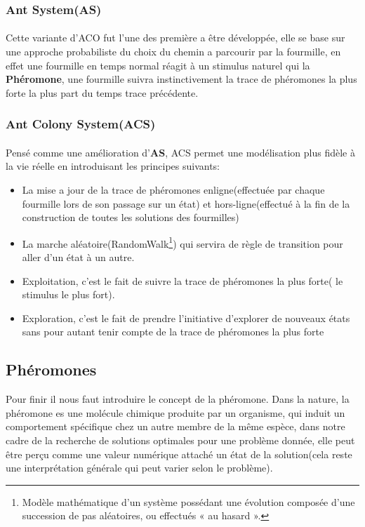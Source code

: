 \subsubsection{Ant System(AS)}
\paragraph{}\label{AS}
Cette variante d'ACO fut l'une des première a être développée, elle se base sur une approche probabiliste du choix du chemin a parcourir par la fourmille, en effet une fourmille en temps normal réagit à un stimulus naturel qui la \textbf{Phéromone}, une fourmille suivra instinctivement la trace de phéromones la plus forte la plus part du temps trace précédente.

\subsubsection{Ant Colony System(ACS)}
\paragraph{}\label{ACS}
Pensé comme une amélioration d'\textbf{AS}, ACS permet une modélisation plus fidèle à la vie réelle en introduisant les principes suivants: 
\begin{itemize}
	\item La mise a jour de la trace de phéromones enligne(effectuée par chaque fourmille lors de son passage sur un état) et hors-ligne(effectué à la fin de la construction de toutes les solutions des fourmilles)
	\item La marche aléatoire(RandomWalk\footnote{Modèle mathématique  d'un système possédant une évolution composée d'une succession de pas aléatoires, ou effectués « au hasard ».}) qui servira de règle de transition pour aller d'un état à un autre.
	\item Exploitation, c'est le fait de suivre la trace de phéromones la plus forte( le stimulus le plus fort).
	\item Exploration, c'est le fait de prendre l'initiative d'explorer de nouveaux états sans pour autant tenir compte de la trace de phéromones la plus forte
\end{itemize}


\subsection{Phéromones}
Pour finir il nous faut introduire le concept de la phéromone. Dans la nature, la phéromone es une molécule chimique produite par un organisme, qui induit un comportement spécifique chez un autre membre de la même espèce, dans notre cadre de la recherche de solutions optimales pour une problème donnée, elle peut être perçu comme une valeur numérique attaché un état de la solution(cela reste une interprétation générale qui peut varier selon le problème).
